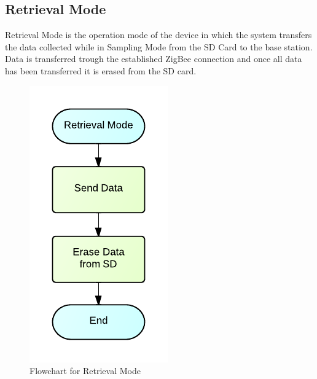 \subsection{Retrieval Mode}
Retrieval Mode is the operation mode of the device in which the system transfers the data collected while in Sampling Mode from the SD Card to the base station. Data is transferred trough the established ZigBee connection and once all data has been transferred it is erased from the SD card.
\begin{figure}[H]
	\centering
	\includegraphics[scale=1.0]{img/RetrievalMode}
	\caption{Flowchart for Retrieval Mode \label{fig:retrivalMode}}
\end{figure}



